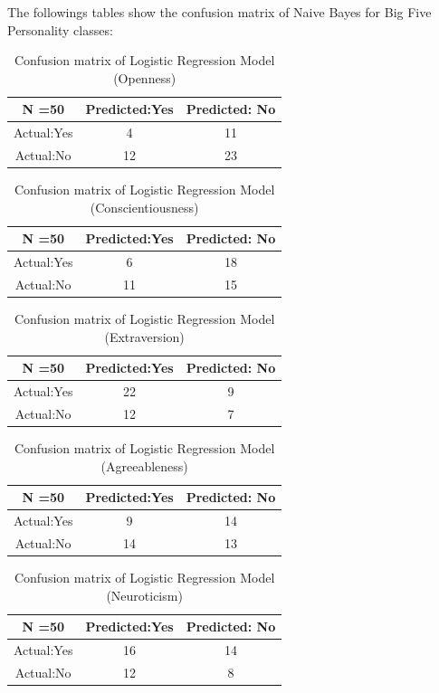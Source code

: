 The followings tables show the confusion matrix of Naive Bayes for Big Five Personality classes:
\begin{table}[!ht]
\centering
\begin{tabular}{ |c|c|c| } 
 \hline
 N =50 & Predicted:Yes & Predicted: No \\
 \hline
 Actual:Yes&4 & 11 \\ 
 \hline
 Actual:No&12 & 23 \\ 
 \hline
\end{tabular}
\caption{Confusion matrix of Logistic Regression Model (Openness)}

\end{table}

\begin{table}[!ht]
\centering
\begin{tabular}{ |c|c|c| } 
 \hline
 N =50 & Predicted:Yes & Predicted: No \\
 \hline
 Actual:Yes&6 & 18 \\ 
 \hline
 Actual:No&11 & 15 \\ 
 \hline
\end{tabular}
\caption{Confusion matrix of Logistic Regression Model (Conscientiousness)}
\end{table}

\begin{table}[!ht]
\centering
\begin{tabular}{ |c|c|c| } 
 \hline
 N =50 & Predicted:Yes & Predicted: No \\
 \hline
 Actual:Yes&22 & 9 \\ 
 \hline
 Actual:No&12 & 7 \\ 
 \hline
\end{tabular}
 \caption{Confusion matrix of Logistic Regression Model (Extraversion)}
\end{table}

\begin{table}[!ht]
\centering
\begin{tabular}{ |c|c|c| } 
 \hline
 N =50 & Predicted:Yes & Predicted: No \\
 \hline
 Actual:Yes&9 & 14 \\ 
 \hline
 Actual:No&14 & 13 \\ 
 \hline
\end{tabular}
 \caption{Confusion matrix of Logistic Regression Model (Agreeableness)}
\end{table}

\begin{table}[!ht]
\centering
\begin{tabular}{ |c|c|c| } 
 \hline
 N =50 & Predicted:Yes & Predicted: No \\
 \hline
 Actual:Yes&16 & 14 \\ 
 \hline
 Actual:No&12 & 8 \\ 
 \hline
\end{tabular}
 \caption{Confusion matrix of Logistic Regression Model (Neuroticism)}
\end{table}


